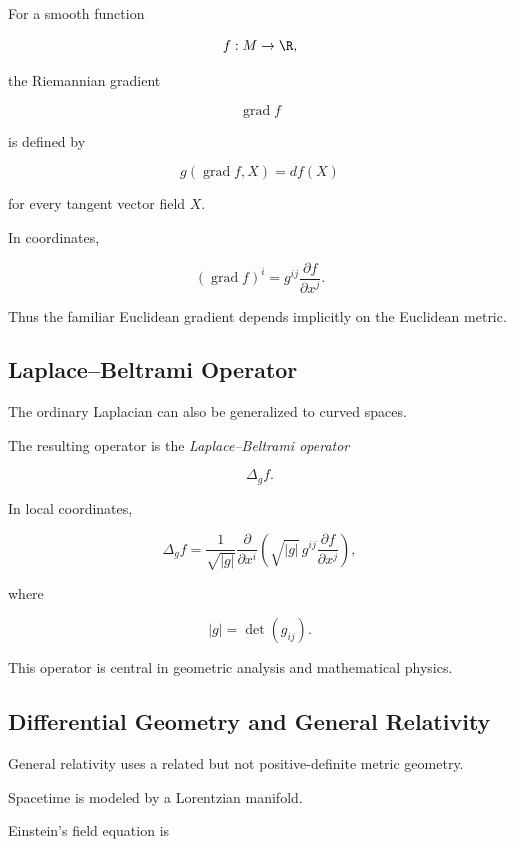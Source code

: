 For a smooth function

\[
f:M\to\R,
\]

the Riemannian gradient

\[
\operatorname{grad}f
\]

is defined by

\[
\boxed{
g(\operatorname{grad}f,X)=df(X)
}
\]

for every tangent vector field \(X\).

In coordinates,

\[
\boxed{
(\operatorname{grad}f)^i
=
g^{ij}
\frac{\partial f}{\partial x^j}.
}
\]

Thus the familiar Euclidean gradient depends implicitly on the Euclidean
metric.

\subsection{Laplace--Beltrami Operator}
\label{subsec:laplace-beltrami}

The ordinary Laplacian can also be generalized to curved spaces.

The resulting operator is the \emph{Laplace--Beltrami operator}

\[
\boxed{
\Delta_g f.
}
\]

In local coordinates,

\[
\boxed{
\Delta_g f
=
\frac{1}{\sqrt{|g|}}
\frac{\partial}{\partial x^i}
\left(
\sqrt{|g|}\,
g^{ij}
\frac{\partial f}{\partial x^j}
\right),
}
\]

where

\[
|g|=\det(g_{ij}).
\]

This operator is central in geometric analysis and mathematical physics.

\subsection{Differential Geometry and General Relativity}
\label{subsec:differential-geometry-relativity}

General relativity uses a related but not positive-definite metric geometry.

Spacetime is modeled by a Lorentzian manifold.

Einstein's field equation is

